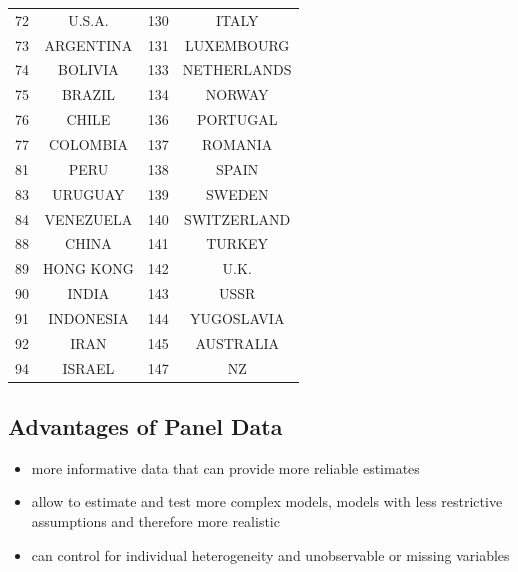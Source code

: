 \documentclass[landscape,letterpaper,9pt]{article}
\begin{document}
\begin{center}
\begin{tabular}{|l|c|l|c|}
72& U.S.A.      &       130 &ITALY       \\
73& ARGENTINA   &       131 &LUXEMBOURG  \\
74& BOLIVIA     &       133 &NETHERLANDS     \\
75& BRAZIL      &       134 &NORWAY      \\
76& CHILE       &       136 &PORTUGAL    \\
77& COLOMBIA    &       137 &ROMANIA    \\
81& PERU        &       138 &SPAIN       \\
83& URUGUAY     &       139 &SWEDEN      \\
84& VENEZUELA   &       140 &SWITZERLAND     \\
88& CHINA       &       141 &TURKEY      \\
89& HONG KONG   &       142 &U.K.        \\
90& INDIA       &       143 &USSR        \\
91& INDONESIA   &       144 &YUGOSLAVIA  \\
92& IRAN        &       145 &AUSTRALIA   \\
94& ISRAEL      &       147 &NZ      \\
\hline
\end{tabular}
\end{center}


\subsection{Advantages of Panel Data}
\begin{itemize}
\item more informative data that can provide more reliable estimates
\item allow to estimate and test more complex models, models with less restrictive assumptions and
therefore more realistic
\item can control for individual heterogeneity and  unobservable or missing variables

\end{itemize}
\end{document}
